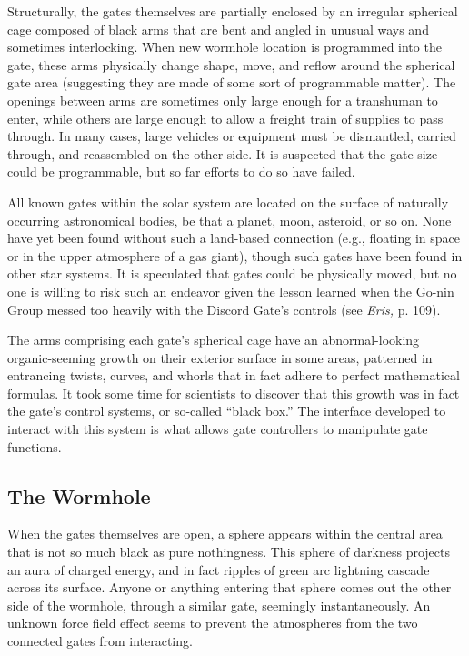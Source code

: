 Structurally, the gates themselves are partially 
enclosed by an irregular spherical cage composed of 
black arms that are bent and angled in unusual ways 
and sometimes interlocking. When new wormhole 
location is programmed into the gate, these arms 
physically change shape, move, and reflow  around 
the spherical gate area (suggesting they are made of 
some sort of programmable matter). The openings 
between arms are sometimes only large enough for 
a transhuman to enter, while others are large enough 
to allow a freight train of supplies to pass through. 
In many cases, large vehicles or equipment must be 
dismantled, carried through, and reassembled on the 
other side. It is suspected that the gate size could be 
programmable, but so far efforts to do so have failed.

All known gates within the solar system are located 
on the surface of naturally occurring astronomical 
bodies, be that a planet, moon, asteroid, or so on. 
None have yet been found without such a land-based 
connection (e.g., floating in space or in the upper 
atmosphere of a gas giant), though such gates have 
been found in other star systems. It is speculated that 
gates could be physically moved, but no one is willing
to risk such an endeavor given the lesson learned
when the Go-nin Group messed too heavily with the 
Discord Gate's controls (see \textit{Eris, }p. 109).

The arms comprising each gate's spherical cage have 
an abnormal-looking organic-seeming growth on their 
exterior surface in some areas, patterned in entrancing
twists, curves, and whorls that in fact adhere to
perfect mathematical formulas. It took some time for 
scientists to discover that this growth was in fact the 
gate's control systems, or so-called ``black box.'' The 
interface developed to interact with this system is what 
allows gate controllers to manipulate gate functions.

\subsection{The Wormhole}

When the gates themselves are open, a sphere appears 
within the central area that is not so much black as 
pure nothingness. This sphere of darkness projects an 
aura of charged energy, and in fact ripples of green 
arc lightning cascade across its surface. Anyone or 
anything entering that sphere comes out the other side 
of the wormhole, through a similar gate, seemingly 
instantaneously. An unknown force field effect seems 
to prevent the atmospheres from the two connected 
gates from interacting.

